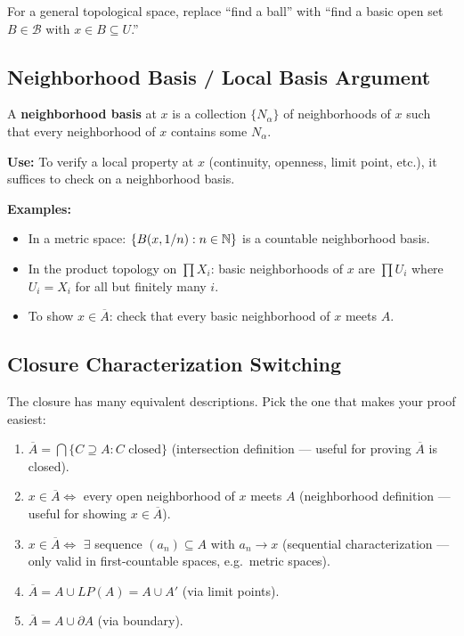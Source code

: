 \documentclass{article}
\begin{document}
For a general topological space, replace ``find a ball'' with ``find a
basic open set $B \in \mathcal{B}$ with $x \in B \subseteq U$.''

\subsection{Neighborhood Basis / Local Basis Argument}
A \textbf{neighborhood basis} at $x$ is a collection $\{N_\alpha\}$ of
neighborhoods of $x$ such that every neighborhood of $x$ contains some
$N_\alpha$.

\textbf{Use:} To verify a local property at $x$ (continuity, openness,
limit point, etc.), it suffices to check on a neighborhood basis.

\textbf{Examples:}
\begin{itemize}
  \item In a metric space: $\{B(x, 1/n) : n \in \mathbb{N}\}$ is a countable
    neighborhood basis.
  \item In the product topology on $\prod X_i$: basic neighborhoods of
    $x$ are $\prod U_i$ where $U_i = X_i$ for all but finitely many $i$.
  \item To show $x \in \overline{A}$: check that every basic
    neighborhood of $x$ meets $A$.
\end{itemize}

\subsection{Closure Characterization Switching}
The closure has many equivalent descriptions. Pick the one that makes
your proof easiest:
\begin{enumerate}
  \item $\overline{A} = \bigcap\{C \supseteq A : C \text{ closed}\}$
    (intersection definition --- useful for proving $\overline{A}$ is closed).
  \item $x \in \overline{A} \iff$ every open neighborhood of $x$ meets $A$
    (neighborhood definition --- useful for showing $x \in \overline{A}$).
  \item $x \in \overline{A} \iff$ $\exists$ sequence $(a_n) \subseteq A$
    with $a_n \to x$ (sequential characterization --- only valid in
    first-countable spaces, e.g.\ metric spaces).
  \item $\overline{A} = A \cup LP(A) = A \cup A'$ (via limit points).
  \item $\overline{A} = A \cup \partial A$ (via boundary).
\end{enumerate}
\end{document}
